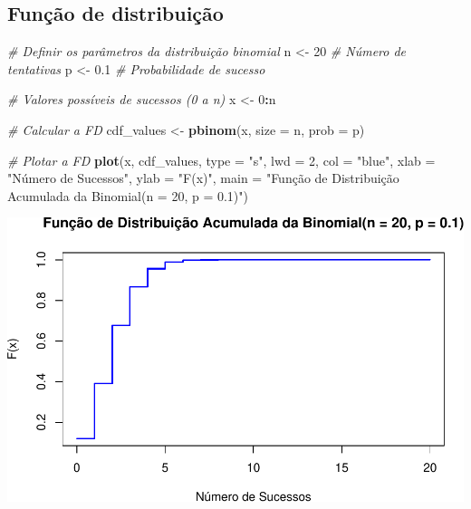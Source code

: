 \documentclass[
]{book}
\newenvironment{Shaded}{\begin{snugshade}}{\end{snugshade}}
\newcommand{\AttributeTok}[1]{\textcolor[rgb]{0.13,0.29,0.53}{#1}}
\newcommand{\CommentTok}[1]{\textcolor[rgb]{0.56,0.35,0.01}{\textit{#1}}}
\newcommand{\DecValTok}[1]{\textcolor[rgb]{0.00,0.00,0.81}{#1}}
\newcommand{\FloatTok}[1]{\textcolor[rgb]{0.00,0.00,0.81}{#1}}
\newcommand{\FunctionTok}[1]{\textcolor[rgb]{0.13,0.29,0.53}{\textbf{#1}}}
\newcommand{\NormalTok}[1]{#1}
\newcommand{\OtherTok}[1]{\textcolor[rgb]{0.56,0.35,0.01}{#1}}
\newcommand{\SpecialCharTok}[1]{\textcolor[rgb]{0.81,0.36,0.00}{\textbf{#1}}}
\newcommand{\StringTok}[1]{\textcolor[rgb]{0.31,0.60,0.02}{#1}}
\begin{document}
\subsection{Função de distribuição}\label{funuxe7uxe3o-de-distribuiuxe7uxe3o}

\begin{Shaded}
\begin{Highlighting}[]
\CommentTok{\# Definir os parâmetros da distribuição binomial}
\NormalTok{n }\OtherTok{\textless{}{-}} \DecValTok{20} \CommentTok{\# Número de tentativas}
\NormalTok{p }\OtherTok{\textless{}{-}} \FloatTok{0.1} \CommentTok{\# Probabilidade de sucesso}

\CommentTok{\# Valores possíveis de sucessos (0 a n)}
\NormalTok{x }\OtherTok{\textless{}{-}} \DecValTok{0}\SpecialCharTok{:}\NormalTok{n}

\CommentTok{\# Calcular a FD}
\NormalTok{cdf\_values }\OtherTok{\textless{}{-}} \FunctionTok{pbinom}\NormalTok{(x, }\AttributeTok{size =}\NormalTok{ n, }\AttributeTok{prob =}\NormalTok{ p)}

\CommentTok{\# Plotar a FD}
\FunctionTok{plot}\NormalTok{(x, cdf\_values, }\AttributeTok{type =} \StringTok{"s"}\NormalTok{, }\AttributeTok{lwd =} \DecValTok{2}\NormalTok{, }\AttributeTok{col =} \StringTok{"blue"}\NormalTok{, }
\AttributeTok{xlab =} \StringTok{"Número de Sucessos"}\NormalTok{, }\AttributeTok{ylab =} \StringTok{"F(x)"}\NormalTok{, }
\AttributeTok{main =} \StringTok{"Função de Distribuição Acumulada da Binomial(n = 20, p = 0.1)"}\NormalTok{)}
\end{Highlighting}
\end{Shaded}

\includegraphics{introR_files/figure-latex/unnamed-chunk-258-1.pdf}
\end{document}
